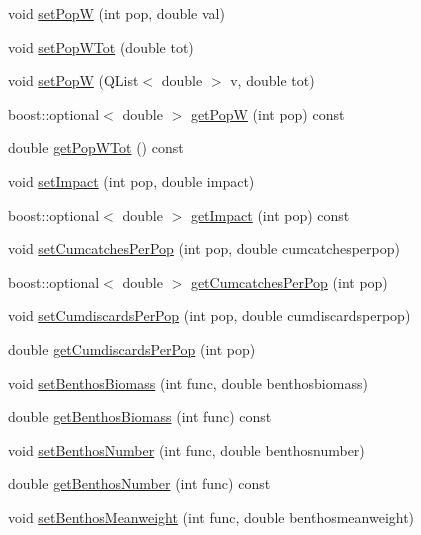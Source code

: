 \begin{DoxyCompactItemize}
\item 
void \mbox{\hyperlink{class_node_data_a519177cacb6e51ae623555a092a5f2b3}{set\+PopW}} (int pop, double val)
\item 
void \mbox{\hyperlink{class_node_data_a52d72c44656a8828f03ade2e3f4342ea}{set\+Pop\+W\+Tot}} (double tot)
\item 
void \mbox{\hyperlink{class_node_data_a6af682956531adb5a57b0513f1deaffd}{set\+PopW}} (Q\+List$<$ double $>$ v, double tot)
\item 
boost\+::optional$<$ double $>$ \mbox{\hyperlink{class_node_data_ac2d689c2bbe1a915b88be7cd7c12cf63}{get\+PopW}} (int pop) const
\item 
double \mbox{\hyperlink{class_node_data_a5903c8c233f8892f1b29baa26f361288}{get\+Pop\+W\+Tot}} () const
\item 
void \mbox{\hyperlink{class_node_data_a3df40665aa9d86d290a978a660c06427}{set\+Impact}} (int pop, double impact)
\item 
boost\+::optional$<$ double $>$ \mbox{\hyperlink{class_node_data_a0c669fe7f991d0aaef02814c054b25c5}{get\+Impact}} (int pop) const
\item 
void \mbox{\hyperlink{class_node_data_a40f50700065a9323e9589f31d2ab57e0}{set\+Cumcatches\+Per\+Pop}} (int pop, double cumcatchesperpop)
\item 
boost\+::optional$<$ double $>$ \mbox{\hyperlink{class_node_data_a2f7c4588c7c8807775058443db8a4987}{get\+Cumcatches\+Per\+Pop}} (int pop)
\item 
void \mbox{\hyperlink{class_node_data_a0e0010c7341b91c1074336c55bb519ac}{set\+Cumdiscards\+Per\+Pop}} (int pop, double cumdiscardsperpop)
\item 
double \mbox{\hyperlink{class_node_data_a4a3d0a7a616a7e7eb4f7fa1fc627c7a5}{get\+Cumdiscards\+Per\+Pop}} (int pop)
\item 
void \mbox{\hyperlink{class_node_data_a8cb0783f063c00339e45cf25e1724112}{set\+Benthos\+Biomass}} (int func, double benthosbiomass)
\item 
double \mbox{\hyperlink{class_node_data_aab5a8f959b02082435507410e0822603}{get\+Benthos\+Biomass}} (int func) const
\item 
void \mbox{\hyperlink{class_node_data_a858944519250709f8f13244947067fb9}{set\+Benthos\+Number}} (int func, double benthosnumber)
\item 
double \mbox{\hyperlink{class_node_data_aa7c2effc9b13c99c159f533f157afbc7}{get\+Benthos\+Number}} (int func) const
\item 
void \mbox{\hyperlink{class_node_data_a44d5979737b1f4ff1c6c8b64e2f9ed77}{set\+Benthos\+Meanweight}} (int func, double benthosmeanweight)

\end{DoxyCompactItemize}
